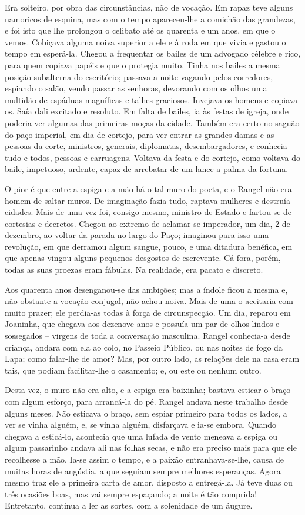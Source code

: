 Era solteiro, por obra das circunstâncias, não de vocação. Em rapaz teve
alguns namoricos de esquina, mas com o tempo apareceu-lhe a comichão das
grandezas, e foi isto que lhe prolongou o celibato até os quarenta e um
anos, em que o vemos. Cobiçava alguma noiva superior a ele e à roda em
que vivia e gastou o tempo em esperá-la. Chegou a frequentar os bailes
de um advogado célebre e rico, para quem copiava papéis e que o protegia
muito. Tinha nos bailes a mesma posição subalterna do escritório;
passava a noite vagando pelos corredores, espiando o salão, vendo passar
as senhoras, devorando com os olhos uma multidão de espáduas magníficas
e talhes graciosos. Invejava os homens e copiava-os. Saía dali excitado
e resoluto. Em falta de bailes, ia às festas de igreja, onde poderia ver
algumas das primeiras moças da cidade. Também era certo no saguão do
paço imperial, em dia de cortejo, para ver entrar as grandes damas e as
pessoas da corte, ministros, generais, diplomatas, desembargadores, e
conhecia tudo e todos, pessoas e carruagens. Voltava da festa e do
cortejo, como voltava do baile, impetuoso, ardente, capaz de arrebatar
de um lance a palma da fortuna.

O pior é que entre a espiga e a mão há o tal muro do poeta, e o Rangel
não era homem de saltar muros. De imaginação fazia tudo, raptava
mulheres e destruía cidades. Mais de uma vez foi, consigo mesmo,
ministro de Estado e fartou-se de cortesias e decretos. Chegou ao
extremo de aclamar-se imperador, um dia, 2 de dezembro, ao voltar da
parada no largo do Paço; imaginou para isso uma revolução, em que
derramou algum sangue, pouco, e uma ditadura benéfica, em que apenas
vingou alguns pequenos desgostos de escrevente. Cá fora, porém, todas as
suas proezas eram fábulas. Na realidade, era pacato e discreto.

Aos quarenta anos desenganou-se das ambições; mas a índole ficou a mesma
e, não obstante a vocação conjugal, não achou noiva. Mais de uma o
aceitaria com muito prazer; ele perdia-as todas à força de
circunspecção. Um dia, reparou em Joaninha, que chegava aos dezenove
anos e possuía um par de olhos lindos e sossegados -- virgens de toda a
conversação masculina. Rangel conhecia-a desde criança, andara com ela
ao colo, no Passeio Público, ou nas noites de fogo da Lapa; como
falar-lhe de amor? Mas, por outro lado, as relações dele na casa eram
tais, que podiam facilitar-lhe o casamento; e, ou este ou nenhum outro.

Desta vez, o muro não era alto, e a espiga era baixinha; bastava esticar
o braço com algum esforço, para arrancá-la do pé. Rangel andava neste
trabalho desde alguns meses. Não esticava o braço, sem espiar primeiro
para todos os lados, a ver se vinha alguém, e, se vinha alguém,
disfarçava e ia-se embora. Quando chegava a esticá-lo, acontecia que uma
lufada de vento meneava a espiga ou algum passarinho andava ali nas
folhas secas, e não era preciso mais para que ele recolhesse a mão.
Ia-se assim o tempo, e a paixão entranhava-se-lhe, causa de muitas horas
de angústia, a que seguiam sempre melhores esperanças. Agora mesmo traz
ele a primeira carta de amor, disposto a entregá-la. Já teve duas ou
três ocasiões boas, mas vai sempre espaçando; a noite é tão comprida!
Entretanto, continua a ler as sortes, com a solenidade de um áugure.

